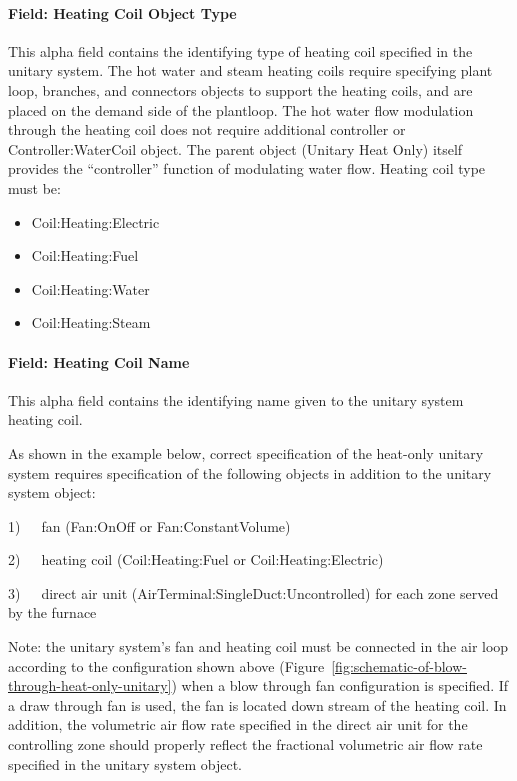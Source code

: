 \paragraph{Field: Heating Coil Object Type}\label{field-heating-coil-object-type-6}

This alpha field contains the identifying type of heating coil specified in the unitary system. The hot water and steam heating coils require specifying plant loop, branches, and connectors objects to support the heating coils, and are placed on the demand side of the plantloop. The hot water flow modulation through the heating coil does not require additional controller or Controller:WaterCoil object. The parent object (Unitary Heat Only) itself provides the ``controller'' function of modulating water flow. Heating coil type must be:

\begin{itemize}
\item
  Coil:Heating:Electric
\item
  Coil:Heating:Fuel
\item
  Coil:Heating:Water
\item
  Coil:Heating:Steam
\end{itemize}

\paragraph{Field: Heating Coil Name}\label{field-heating-coil-name-6}

This alpha field contains the identifying name given to the unitary system heating coil.

As shown in the example below, correct specification of the heat-only unitary system requires specification of the following objects in addition to the unitary system object:

1)~~~fan (Fan:OnOff or Fan:ConstantVolume)

2)~~~heating coil (Coil:Heating:Fuel or Coil:Heating:Electric)

3)~~~direct air unit (AirTerminal:SingleDuct:Uncontrolled) for each zone served by the furnace

Note: the unitary system's fan and heating coil must be connected in the air loop according to the configuration shown above (Figure~\ref{fig:schematic-of-blow-through-heat-only-unitary}) when a blow through fan configuration is specified. If a draw through fan is used, the fan is located down stream of the heating coil. In addition, the volumetric air flow rate specified in the direct air unit for the controlling zone should properly reflect the fractional volumetric air flow rate specified in the unitary system object.

